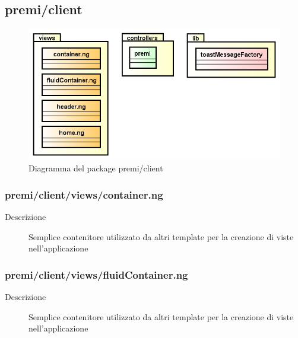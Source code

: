 \clearpage
\subsection{premi/client}
\begin{figure}[h]
\begin{center}
\includegraphics[scale=0.50]{img/diapkg/client.png}
\caption{Diagramma del package premi/client}
\end{center}
\end{figure}



\subsubsection{premi/client/views/container.ng}

\begin{description}
\item[Descrizione] \hfill
	Semplice contenitore utilizzato da altri template per la creazione di viste nell'applicazione
\end{description}



\subsubsection{premi/client/views/fluidContainer.ng}

\begin{description}
\item[Descrizione] \hfill
	Semplice contenitore utilizzato da altri template per la creazione di viste nell'applicazione
\end{description}



